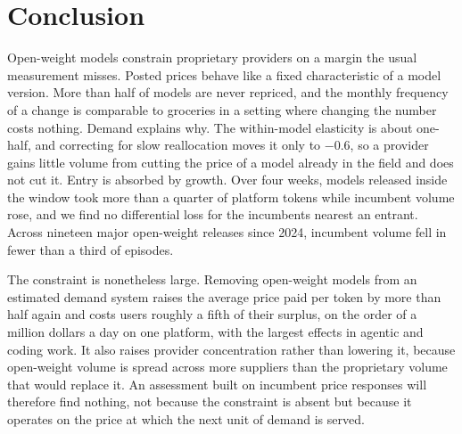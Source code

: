 \documentclass{article}
\begin{document}
\section{Conclusion}

Open-weight models constrain proprietary providers on a margin the usual measurement misses.
Posted prices behave like a fixed characteristic of a model version. More than half of models
are never repriced, and the monthly frequency of a change is comparable to groceries in a
setting where changing the number costs nothing. Demand explains why. The within-model
elasticity is about one-half, and correcting for slow reallocation moves it only to $-0.6$, so
a provider gains little volume from cutting the price of a model already in the field and does
not cut it. Entry is absorbed by growth. Over four weeks, models released inside the window took more
than a quarter of platform tokens while incumbent volume rose, and we find no differential
loss for the incumbents nearest an entrant. Across nineteen major open-weight releases since
2024, incumbent volume fell in fewer than a third of episodes.

The constraint is nonetheless large. Removing open-weight models from an estimated demand
system raises the average price paid per token by more than half again and costs users roughly
a fifth of their surplus, on the order of a million dollars a day on one platform, with the
largest effects in agentic and coding work. It also raises provider concentration rather than
lowering it, because open-weight volume is spread across more suppliers than the proprietary
volume that would replace it. An assessment built on incumbent price responses will therefore
find nothing, not because the constraint is absent but because it operates on the price at
which the next unit of demand is served.
\end{document}
